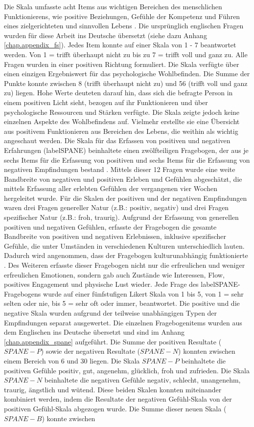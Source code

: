 Die Skala umfasste acht Items aus wichtigen Bereichen des menschlichen Funktionierens, wie positive Beziehungen, Gefühle der Kompetenz und Führen eines zielgerichteten und sinnvollen Lebens \cite{Diener:2010}. Die ursprünglich englischen Fragen wurden für diese Arbeit ins Deutsche übersetzt (siehe dazu Anhang \ref{chap.appendix_fs}). Jedes Item konnte auf einer Skala von 1 - 7 beantwortet werden. Von 1 = trifft überhaupt nicht zu bis zu 7 = trifft voll und ganz zu. Alle Fragen wurden in einer positiven Richtung formuliert. Die Skala verfügte über einen einzigen Ergebniswert für das psychologische Wohlbefinden. Die Summe der Punkte konnte zwischen 8 (trifft überhaupt nicht zu) und 56 (trifft voll und ganz zu) liegen. Hohe Werte deuteten darauf hin, dass sich die befragte Person in einem positiven Licht sieht, bezogen auf ihr Funktionieren und über psychologische Ressourcen und Stärken verfügte. Die Skala zeigte jedoch keine einzelnen Aspekte des Wohlbefindens auf. Vielmehr erstellte sie eine Übersicht aus positivem Funktionieren aus Bereichen des Lebens, die weithin als wichtig angeschaut werden. Die Skala für das Erfassen von positiven und negativen Erfahrungen (\gls{labelSPANE}) beinhaltete einen zwölfteiligen Fragebogen, der aus je sechs Items für die Erfassung von positiven und sechs Items für die Erfassung von negativen Empfindungen bestand \cite{Diener:2010}. Mittels dieser 12 Fragen wurde eine weite Bandbreite von negativen und positiven Erleben und Gefühlen abgeschätzt, die mittels Erfassung aller erlebten Gefühlen der vergangenen vier Wochen hergeleitet wurde. Für die Skalen der positiven und der negativen Empfindungen waren drei Fragen genereller Natur (z.B.: positiv, negativ) und drei Fragen spezifischer Natur (z.B.: froh, traurig). Aufgrund der Erfassung von generellen positiven und negativen Gefühlen, erfasste der Fragebogen die gesamte Bandbreite von positiven und negativen Erlebnissen, inklusive spezifischer Gefühle, die unter Umständen in verschiedenen Kulturen unterschiedlich lauten. Dadurch wird angenommen, dass der Fragebogen kulturunabhängig funktionierte \cite{Silva2013}. Des Weiteren erfasste dieser Fragebogen nicht nur die erfreulichen und weniger erfreulichen Emotionen, sondern gab auch Zustände wie Interessen, Flow, positives Engagement und physische Lust wieder. Jede Frage des \gls{labelSPANE}-Fragebogens wurde auf einer fünfstufigen Likert Skala von 1 bis 5, von 1 = sehr selten oder nie, bis 5 = sehr oft oder immer, beantwortet. Die positive und die negative Skala wurden aufgrund der teilweise unabhängigen Typen der Empfindungen separat ausgewertet. Die einzelnen Fragebogenitems wurden aus dem Englischen ins Deutsche übersetzt und sind im Anhang \ref{chap.appendix_spane} aufgeführt. Die Summe der positiven Resultate ($SPANE-P$) sowie der negativen Resultate ($SPANE-N$) konnten zwischen einem Bereich von 6 und 30 liegen. Die Skala $SPANE-P$ beinhaltete die positiven Gefühle positiv, gut, angenehm, glücklich, froh und zufrieden. Die Skala $SPANE-N$ beinhaltete die negativen Gefühle negativ, schlecht, unangenehm, traurig, ängstlich und wütend. Diese beiden Skalen konnten miteinander kombiniert werden, indem die Resultate der negativen Gefühl-Skala von der positiven Gefühl-Skala abgezogen wurde. Die Summe dieser neuen Skala ($SPANE-B$) konnte zwischen 